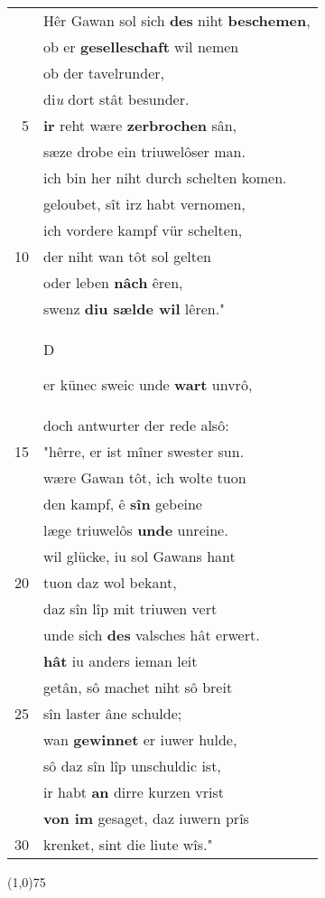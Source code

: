 \documentclass[8pt,a4paper,notitlepage]{article}
\begin{document}
\begin{table}[ht]
\begin{minipage}[t]{0.5\linewidth}
\begin{tabular}{rl}
 & Hêr Gawan sol sich \textbf{des} niht \textbf{beschemen},\\ 
 & ob er \textbf{geselleschaft} wil nemen\\ 
 & ob der tavelrunder,\\ 
 & di\textit{u} dort stât besunder.\\ 
5 & \textbf{ir} reht wære \textbf{zerbrochen} sân,\\ 
 & sæze drobe ein triuwelôser man.\\ 
 & ich bin her niht durch schelten komen.\\ 
 & geloubet, sît irz habt vernomen,\\ 
 & ich vordere kampf vür schelten,\\ 
10 & der niht wan tôt sol gelten\\ 
 & oder leben \textbf{nâch} êren,\\ 
 & swenz \textbf{diu sælde wil} lêren."\\ 
 & \begin{large}D\end{large}er künec sweic unde \textbf{wart} unvrô,\\ 
 & doch antwurter der rede alsô:\\ 
15 & "hêrre, er ist mîner swester sun.\\ 
 & wære Gawan tôt, ich wolte tuon\\ 
 & den kampf, ê \textbf{sîn} gebeine\\ 
 & læge triuwelôs \textbf{unde} unreine.\\ 
 & wil glücke, iu sol Gawans hant\\ 
20 & tuon daz wol bekant,\\ 
 & daz sîn lîp mit triuwen vert\\ 
 & unde sich \textbf{des} valsches hât erwert.\\ 
 & \textbf{hât} iu anders ieman leit\\ 
 & getân, sô machet niht sô breit\\ 
25 & sîn laster âne schulde;\\ 
 & wan \textbf{gewinnet} er iuwer hulde,\\ 
 & sô daz sîn lîp unschuldic ist,\\ 
 & ir habt \textbf{an} dirre kurzen vrist\\ 
 & \textbf{von im} gesaget, daz iuwern prîs\\ 
30 & krenket, sint die liute wîs."\\ 
\end{tabular}
\scriptsize
\line(1,0){75} \newline

\end{minipage}
\end{table}
\end{document}
